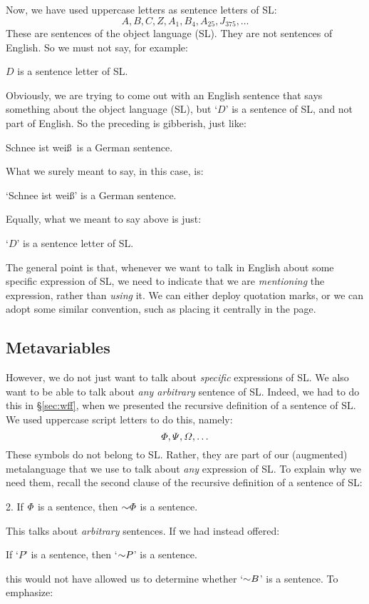 Now, we have used uppercase letters as sentence letters of SL:
	$$A, B, C, Z, A_1, B_4, A_{25}, J_{375},\ldots$$
These are sentences of the object language (SL). They are not sentences of English. So we must not say, for example:
	\begin{ebullet}
		\item $D$ is a sentence letter of SL.
	\end{ebullet}
Obviously, we are trying to come out with an English sentence that says something about the object language (SL), but `$D$' is a sentence of SL, and not part of English. So the preceding is gibberish, just like:
	\begin{ebullet}
		\item Schnee ist wei\ss\ is a German sentence.
	\end{ebullet}
What we surely meant to say, in this case, is:
	\begin{ebullet}
		\item `Schnee ist wei\ss' is a German sentence.
	\end{ebullet}
Equally, what we meant to say above is just:
	\begin{ebullet}
		\item `$D$' is a sentence letter of SL.
	\end{ebullet}
The general point is that, whenever we want to talk in English about some specific expression of SL, we need to indicate that we are \emph{mentioning} the expression, rather than \emph{using} it. We can either deploy quotation marks, or we can adopt some similar convention, such as  placing it centrally in the page.


\subsection{Metavariables}\label{s:Metavariables}
However, we do not just want to talk about \emph{specific} expressions of SL. We also want to be able to talk about \emph{any arbitrary} sentence of SL. Indeed, we had to do this in \S\ref{sec:wff}, when we presented the recursive definition of a sentence of SL. We used uppercase script letters to do this, namely:
	$$\varPhi{}, \varPsi{}, \varOmega{}, \ldots$$
These symbols do not belong to SL. Rather, they are part of our (augmented) metalanguage that we use to talk about \emph{any} expression of SL. To explain why we need them, recall the second clause of the recursive definition of a sentence of SL:
	\begin{earg}
		\item[2.] If $\varPhi{}$ is a sentence, then $\enot \metaA{}$ is a sentence.
	\end{earg}
This talks about \emph{arbitrary} sentences. If we had instead offered:
	\begin{ebullet}
		\item If `$P$' is a sentence, then `$\enot P$' is a sentence.
	\end{ebullet}
this would not have allowed us to determine whether `$\enot B$' is a sentence. To emphasize:

